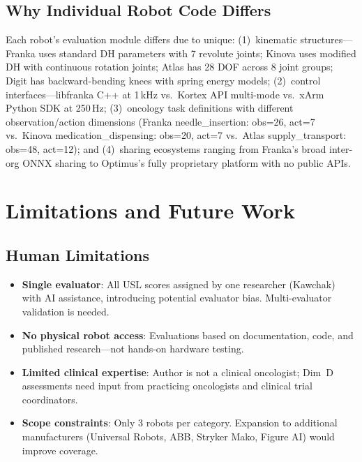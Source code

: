 \documentclass[11pt,a4paper]{article}
\begin{document}
\subsection{Why Individual Robot Code Differs}
Each robot's evaluation module differs due to unique: (1)~kinematic structures---Franka uses standard DH parameters with 7 revolute joints; Kinova uses modified DH with continuous rotation joints; Atlas has 28 DOF across 8 joint groups; Digit has backward-bending knees with spring energy models; (2)~control interfaces---libfranka C++ at 1\,kHz vs.\ Kortex API multi-mode vs.\ xArm Python SDK at 250\,Hz; (3)~oncology task definitions with different observation/action dimensions (Franka needle\_insertion: obs=26, act=7 vs.\ Kinova medication\_dispensing: obs=20, act=7 vs.\ Atlas supply\_transport: obs=48, act=12); and (4)~sharing ecosystems ranging from Franka's broad inter-org ONNX sharing to Optimus's fully proprietary platform with no public APIs.

\section{Limitations and Future Work}
\label{sec:limitations}

\subsection{Human Limitations}
\begin{itemize}
  \item \textbf{Single evaluator}: All USL scores assigned by one researcher (Kawchak) with AI assistance, introducing potential evaluator bias. Multi-evaluator validation is needed.
  \item \textbf{No physical robot access}: Evaluations based on documentation, code, and published research---not hands-on hardware testing.
  \item \textbf{Limited clinical expertise}: Author is not a clinical oncologist; Dim~D assessments need input from practicing oncologists and clinical trial coordinators.
  \item \textbf{Scope constraints}: Only 3 robots per category. Expansion to additional manufacturers (Universal Robots, ABB, Stryker Mako, Figure AI) would improve coverage.
\end{itemize}
\end{document}
